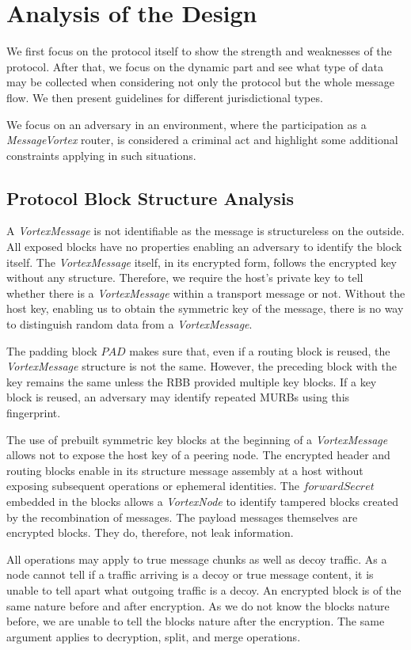 \documentclass[acmsmall, screen, final, natbib=false]{acmart}
\begin{document}
	\section{Analysis of the Design\label{sec:discussion}}
	We first focus on the protocol itself to show the strength and weaknesses of the protocol. After that, we focus on the dynamic part and see what type of data may be collected when considering not only the protocol but the whole message flow. We then present guidelines for different jurisdictional types.
	
	We focus on an adversary in an environment, where the participation as a \emph{MessageVortex} router, is considered a criminal act and highlight some additional constraints applying in such situations.
	
	\subsection{Protocol Block Structure Analysis\label{sec:staticAnalysis}}
	A \emph{VortexMessage} is not identifiable as the message is structureless on the outside. All exposed blocks have no properties enabling an adversary to identify the block itself. The \emph{VortexMessage} itself, in its encrypted form, follows the encrypted key without any structure. Therefore, we require the host's private key to tell whether there is a \emph{VortexMessage} within a transport message or not. Without the host key, enabling us to obtain the symmetric key of the message, there is no way to distinguish random data from a \emph{VortexMessage}.
	
	The padding block $PAD$ makes sure that, even if a routing block is reused, the \emph{VortexMessage} structure is not the same. However, the preceding block with the key remains the same unless the RBB provided multiple key blocks. If a key block is reused, an adversary may identify repeated MURBs using this fingerprint.
	
	The use of prebuilt symmetric key blocks at the beginning of a \emph{VortexMessage} allows not to expose the host key of a peering node. The encrypted header and routing blocks enable in its structure message assembly at a host without exposing subsequent operations or ephemeral identities. The $forwardSecret$ embedded in the blocks allows a \emph{VortexNode} to identify tampered blocks created by the recombination of messages. The payload messages themselves are encrypted blocks. They do, therefore, not leak information.
	
	All operations may apply to true message chunks as well as decoy traffic. As a node cannot tell if a traffic arriving is a decoy or true message content, it is unable to tell apart what outgoing traffic is a decoy. An encrypted block is of the same nature before and after encryption. As we do not know the blocks nature before, we are unable to tell the blocks nature after the encryption. The same argument applies to decryption, split, and merge operations. 
	
\end{document}
